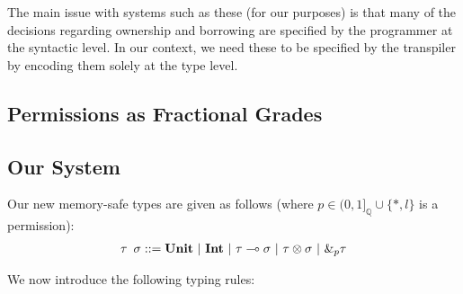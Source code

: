 \documentclass{article}
\renewcommand\em{\bfseries}
\begin{document}

The main issue with systems such as these (for our purposes) is that many of the decisions regarding ownership and borrowing are specified by the programmer at the syntactic level. In our context, we need these to be specified by the transpiler by encoding them solely at the type level. 



\subsection{Permissions as Fractional Grades}

\subsection{Our System}

Our new memory-safe types are given as follows (where $p \in (0, 1]_{\mathbb{Q}} \cup \{*, l\}$ is a permission):
\begin{align*}
    \tau \hspace{0.5em} \sigma ::= \textbf{Unit} ~|~ \textbf{Int} ~|~ \tau \multimap \sigma ~|~ \tau \otimes \sigma ~|~ \&_p \tau
\end{align*}

We now introduce the following typing rules:


\renewcommand\em{\it}
\printbibliography[title={References}]
\end{document}
